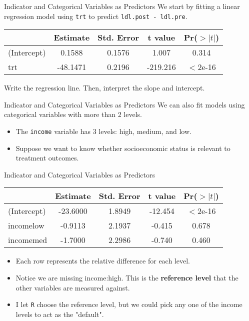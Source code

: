 \begin{frame}{Indicator and Categorical Variables as Predictors}
    We start by fitting a linear regression model using \texttt{trt} to predict \texttt{ldl.post - ldl.pre}.
    \begin{table}[h]
        \centering
        \begin{tabular}{lcccc}
            \hline
                        & Estimate & Std. Error & t value & Pr($>|t|$) \\
            \hline
            (Intercept) &  0.1588  & 0.1576  &  1.007  &  0.314   \\
            trt         & -48.1471 & 0.2196 & -219.216 &  $<$2e-16 \\
            \hline
        \end{tabular}
    \end{table}
    Write the regression line. Then, interpret the slope and intercept.
\end{frame}

\begin{frame}{Indicator and Categorical Variables as Predictors}
    We can also fit models using categorical variables with more than 2 levels. 
    \begin{itemize}
        \item The \texttt{income} variable has 3 levels: high, medium, and low.
        \item Suppose we want to know whether socioeconomic status is relevant to treatment outcomes.
    \end{itemize}
\end{frame}

\begin{frame}{Indicator and Categorical Variables as Predictors}
    \begin{table}[h]
        \centering
        \begin{tabular}{lcccc}
            \hline
                        & Estimate & Std. Error & t value & Pr($>|t|$) \\
            \hline
            (Intercept) & -23.6000   &  1.8949& -12.454  & $<$2e-16 \\
            incomelow   &  -0.9113   &  2.1937 & -0.415   & 0.678  \\ 
            incomemed   &  -1.7000   &  2.2986  &-0.740&    0.460 \\
            \hline
        \end{tabular}
    \end{table}
    \begin{itemize}
        \item Each row represents the relative difference for each level.
        \item Notice we are missing income:high. This is the \textbf{reference level} that the other variables are measured against.
        \item I let \texttt{R} choose the reference level, but we could pick any one of the income levels to act as the "default".
    \end{itemize}
\end{frame}

